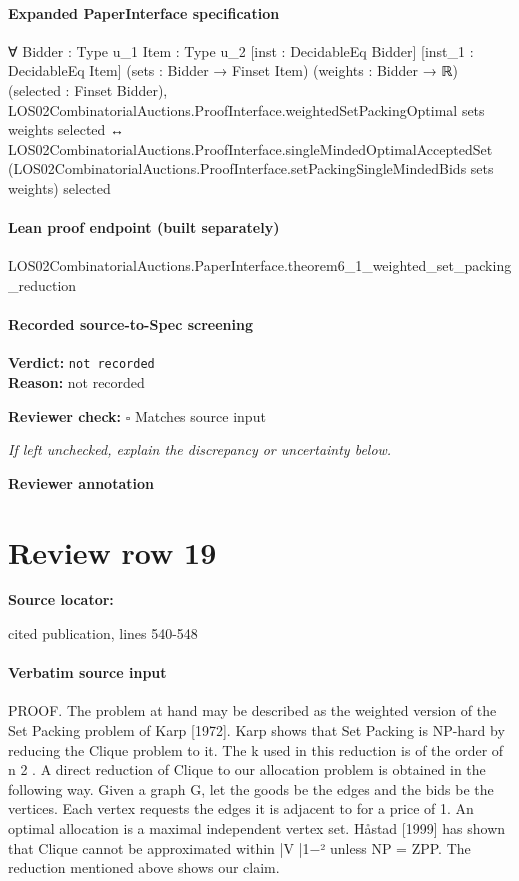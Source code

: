 \documentclass[10pt]{article}
\newcommand{\reviewerbox}{%
  \par\noindent\fbox{\parbox{0.96\linewidth}{\rule{0pt}{0.38in}}}\par
}
\newcommand{\reviewmatch}[1]{%
  \par\noindent\textbf{Reviewer check:} $\square$\; #1\par
  \noindent\emph{If left unchecked, explain the discrepancy or uncertainty below.}\par
}
\begin{document}
\paragraph{Expanded PaperInterface specification}
\begin{ReviewVerbatim}
∀ {Bidder : Type u_1} {Item : Type u_2} [inst : DecidableEq Bidder] [inst_1 : DecidableEq Item]
  (sets : Bidder → Finset Item) (weights : Bidder → ℝ) (selected : Finset Bidder),
  LOS02CombinatorialAuctions.ProofInterface.weightedSetPackingOptimal sets weights selected ↔
    LOS02CombinatorialAuctions.ProofInterface.singleMindedOptimalAcceptedSet
      (LOS02CombinatorialAuctions.ProofInterface.setPackingSingleMindedBids sets weights) selected
\end{ReviewVerbatim}

\paragraph{Lean proof endpoint (built separately)}\begin{ReviewVerbatim}
LOS02CombinatorialAuctions.PaperInterface.theorem6_1_weighted_set_packing_reduction
\end{ReviewVerbatim}

\paragraph{Recorded source-to-Spec screening}
\textbf{Verdict:} \texttt{not recorded}
\\
\textbf{Reason:} not recorded
\reviewmatch{Matches source input}
\noindent\textbf{Reviewer annotation}\par
\reviewerbox
\clearpage
\hypertarget{source-claim-36aed816d8ba695f}{}
\section*{Review row 19}
\textbf{Source locator:} {\footnotesize\raggedright cited publication, lines 540-\allowbreak{}548\par}
\paragraph{Verbatim source input}
\begin{ReviewVerbatim}
PROOF. The problem at hand may be described as the weighted version of the
Set Packing problem of Karp [1972]. Karp shows that Set Packing is NP-hard by
reducing the Clique problem to it. The k used in this reduction is of the order of n 2 .
A direct reduction of Clique to our allocation problem is obtained in the following
way. Given a graph G, let the goods be the edges and the bids be the vertices. Each
vertex requests the edges it is adjacent to for a price of 1. An optimal allocation
is a maximal independent vertex set. Håstad [1999] has shown that Clique cannot
be approximated within |V |1−² unless NP = ZPP. The reduction mentioned above
shows our claim.
\end{ReviewVerbatim}
\end{document}

